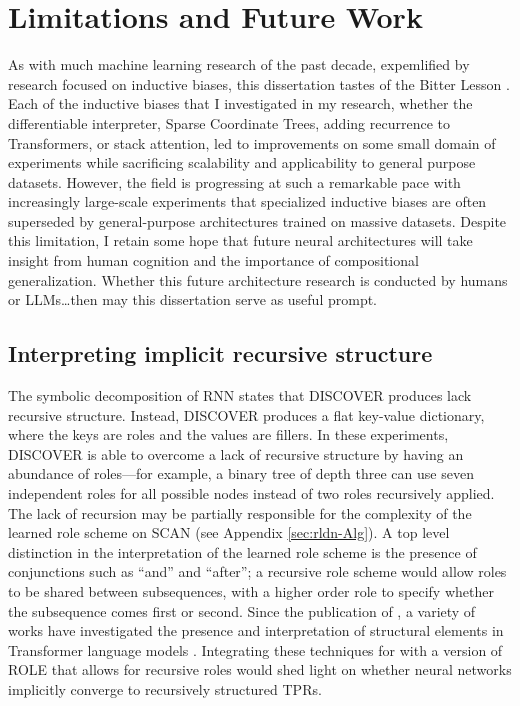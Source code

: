 \section{Limitations and Future Work}

As with much machine learning research of the past decade, expemlified by research focused on inductive biases, this dissertation tastes of the Bitter Lesson \citep{Sutton2019BitterLesson}. Each of the inductive biases that I investigated in my research, whether the differentiable interpreter, Sparse Coordinate Trees, adding recurrence to Transformers, or stack attention, led to improvements on some small domain of experiments while sacrificing scalability and applicability to general purpose datasets. However, the field is progressing at such a remarkable pace with increasingly large-scale experiments that specialized inductive biases are often superseded by general-purpose architectures trained on massive datasets. Despite this limitation, I retain some hope that future neural architectures will take insight from human cognition and the importance of compositional generalization. Whether this future architecture research is conducted by humans or LLMs\ldots then may this dissertation serve as useful prompt.

\subsection{Interpreting implicit recursive structure}
The symbolic decomposition of RNN states that DISCOVER produces lack recursive structure. Instead, DISCOVER produces a flat key-value dictionary, where the keys are roles and the values are fillers. In these experiments, DISCOVER is able to overcome a lack of recursive structure by having an abundance of roles—for example, a binary tree of depth three can use seven independent roles for all possible nodes instead of two roles recursively applied. The lack of recursion may be partially responsible for the complexity of the learned role scheme on SCAN (see Appendix \ref{sec:rldn-Alg}). A top level distinction in the interpretation of the learned role scheme is the presence of conjunctions such as ``and'' and ``after''; a recursive role scheme would allow roles to be shared between subsequences, with a higher order role to specify whether the subsequence comes first or second. Since the publication of \citet{soulos2019discovering}, a variety of works have investigated the presence and interpretation of structural elements in Transformer language models \citep{hewitt2019structural,murty2022characterizing,murty2023grokking}. Integrating these techniques for with a version of ROLE that allows for recursive roles would shed light on whether neural networks implicitly converge to recursively structured TPRs.

